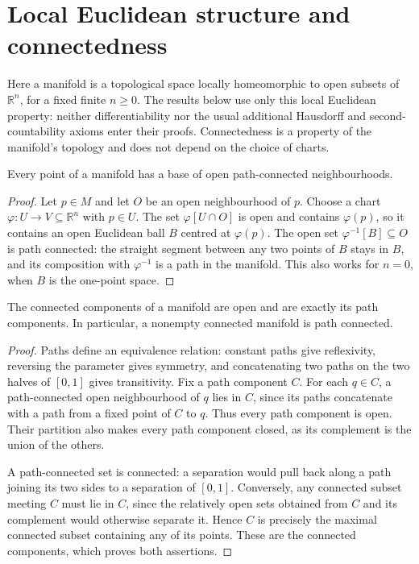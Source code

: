 \def\topic{Differential geometry}

\section{Local Euclidean structure and connectedness}
Here a manifold is a topological space locally homeomorphic to open
subsets of $\mathbb R^n$, for a fixed finite $n\geq0$. The results below
use only this local Euclidean property: neither differentiability nor
the usual additional Hausdorff and second-countability axioms enter
their proofs. Connectedness is a property of the manifold's topology
and does not depend on the choice of charts.

\begin{lemma}
Every point of a manifold has a base of open path-connected
neighbourhoods.
\end{lemma}
\begin{proof}
Let $p\in M$ and let $O$ be an open neighbourhood of $p$. Choose a
chart $\varphi:U\to V\subseteq\mathbb R^n$ with $p\in U$. The set
$\varphi[U\cap O]$ is open and contains $\varphi(p)$, so it contains
an open Euclidean ball $B$ centred at $\varphi(p)$. The open set
$\varphi^{-1}[B]\subseteq O$ is path connected: the straight segment
between any two points of $B$ stays in $B$, and its composition with
$\varphi^{-1}$ is a path in the manifold. This also works for $n=0$,
when $B$ is the one-point space.
\end{proof}

\begin{theorem}
The connected components of a manifold are open and are exactly its
path components. In particular, a nonempty connected manifold is
path connected.
\end{theorem}
\begin{proof}
Paths define an equivalence relation: constant paths give reflexivity,
reversing the parameter gives symmetry, and concatenating two paths
on the two halves of $[0,1]$ gives transitivity. Fix a path component
$C$. For each $q\in C$, a path-connected open neighbourhood of $q$
lies in $C$, since its paths concatenate with a path from a fixed
point of $C$ to $q$. Thus every path component is open. Their partition
also makes every path component closed, as its complement is the
union of the others.

A path-connected set is connected: a separation would pull back
along a path joining its two sides to a separation of $[0,1]$.
Conversely, any connected subset meeting $C$ must lie in $C$, since
the relatively open sets obtained from $C$ and its complement would
otherwise separate it. Hence $C$ is precisely the maximal connected
subset containing any of its points. These are the connected
components, which proves both assertions.
\end{proof}

